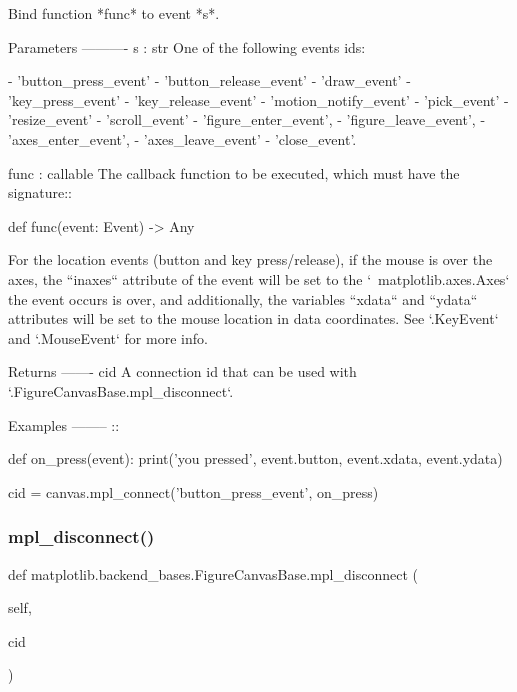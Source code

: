 \begin{DoxyVerb}Bind function *func* to event *s*.

Parameters
----------
s : str
    One of the following events ids:

    - 'button_press_event'
    - 'button_release_event'
    - 'draw_event'
    - 'key_press_event'
    - 'key_release_event'
    - 'motion_notify_event'
    - 'pick_event'
    - 'resize_event'
    - 'scroll_event'
    - 'figure_enter_event',
    - 'figure_leave_event',
    - 'axes_enter_event',
    - 'axes_leave_event'
    - 'close_event'.

func : callable
    The callback function to be executed, which must have the
    signature::

def func(event: Event) -> Any

    For the location events (button and key press/release), if the
    mouse is over the axes, the ``inaxes`` attribute of the event will
    be set to the `~matplotlib.axes.Axes` the event occurs is over, and
    additionally, the variables ``xdata`` and ``ydata`` attributes will
    be set to the mouse location in data coordinates.  See `.KeyEvent`
    and `.MouseEvent` for more info.

Returns
-------
cid
    A connection id that can be used with
    `.FigureCanvasBase.mpl_disconnect`.

Examples
--------
::

    def on_press(event):
print('you pressed', event.button, event.xdata, event.ydata)

    cid = canvas.mpl_connect('button_press_event', on_press)
\end{DoxyVerb}
 \mbox{\label{classmatplotlib_1_1backend__bases_1_1FigureCanvasBase_a02c15e6f3e9e3daa0835733a09c76e34}} 
\subsubsection{\texorpdfstring{mpl\+\_\+disconnect()}{mpl\_disconnect()}}
{\footnotesize\ttfamily def matplotlib.\+backend\+\_\+bases.\+Figure\+Canvas\+Base.\+mpl\+\_\+disconnect (\begin{DoxyParamCaption}\item[{}]{self,  }\item[{}]{cid }\end{DoxyParamCaption})}

